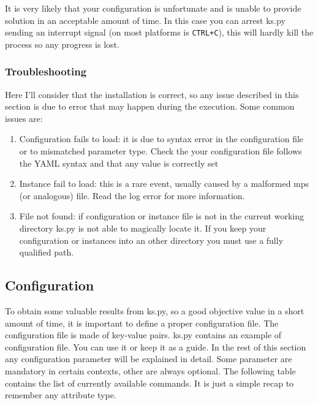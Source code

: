        It is very likely that your configuration is unfortunate and is unable to provide solution in an acceptable amount of time. In this case you can arrest ks.py sending an interrupt signal 
        (on most platforms is \texttt{CTRL+C}), this will hardly kill the process so any progress is lost. 

        \subsubsection{Troubleshooting}
            Here I'll consider that the installation is correct, so any issue described in this section is due to error that may happen during the execution.
            Some common issues are:
            \begin{enumerate}
                \item Configuration fails to load: it is due to syntax error in the configuration file or to mismatched parameter type. Check the your configuration file
                follows the YAML syntax and that any value is correctly set
                \item Instance fail to load: this is a rare event, usually caused by a malformed mps (or analogous) file. Read the log error for more information.
                \item File not found: if configuration or instance file is not in the current working directory ks.py is not able to magically locate it. If you keep your 
                configuration or instances into an other directory you must use a fully qualified path. 
            \end{enumerate}


    \subsection{Configuration}
        To obtain some valuable results from ks.py, so a good objective value in a short amount of time, it is important to define a proper configuration file. 
        The configuration file is made of key-value pairs. 
        ks.py contains an example of configuration file. You can use it or keep it as a guide. In the rest of this section any configuration parameter will be 
        explained in detail. Some parameter are mandatory in certain contexts, other are always optional. The following table contains the list of currently 
        available commands. It is just a simple recap to remember any attribute type.
  
        \newpage

